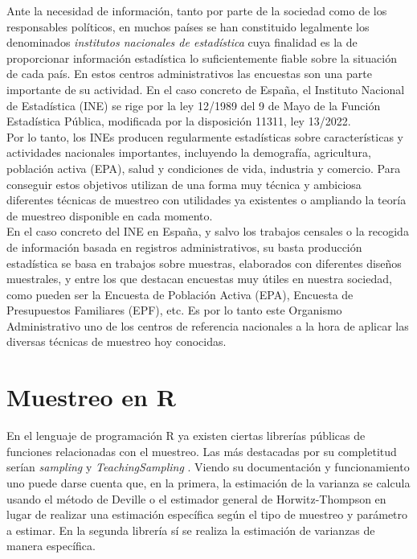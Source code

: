Ante la necesidad de información, tanto por parte de la sociedad como de los responsables políticos, en muchos países se han constituido legalmente los denominados \textit{institutos nacionales de estadística} cuya finalidad es la de proporcionar información estadística lo suficientemente fiable sobre la situación de cada país. En estos centros administrativos las encuestas son una parte importante de su actividad. En el caso concreto de España, el Instituto Nacional de Estadística (INE) se rige por la ley 12/1989 del 9 de Mayo de la Función Estadística Pública, modificada por la disposición 11311, ley 13/2022.\\

Por lo tanto, los INEs producen regularmente estadísticas sobre características y actividades nacionales importantes, incluyendo la demografía, agricultura, población activa (EPA), salud y condiciones de vida, industria y comercio. Para conseguir estos objetivos utilizan de una forma muy técnica y ambiciosa diferentes técnicas de muestreo con utilidades ya existentes o ampliando la teoría de muestreo disponible en cada momento. \\

En el caso concreto del INE en España, y salvo los trabajos censales o la recogida de información basada en registros administrativos, su basta producción estadística se basa en trabajos sobre muestras, elaborados con diferentes diseños muestrales, y entre los que destacan encuestas muy útiles en nuestra sociedad, como pueden ser la Encuesta de Población Activa (EPA),  Encuesta de Presupuestos Familiares (EPF), etc. Es por lo tanto este Organismo Administrativo uno de los centros de referencia nacionales a la hora de aplicar las diversas técnicas de muestreo hoy conocidas.

\section{Muestreo en R}
En el lenguaje de programación R ya existen ciertas librerías públicas de funciones relacionadas con el muestreo. Las más destacadas por su completitud serían \textit{sampling} \cite{sampling} y \textit{TeachingSampling} \cite{TeachingSampling}. Viendo su documentación y funcionamiento uno puede darse cuenta que, en la primera, la estimación de la varianza se calcula usando el método de Deville o el estimador general de Horwitz-Thompson en lugar de realizar una estimación específica según el tipo de muestreo y parámetro a estimar. En la segunda librería sí se realiza la estimación de varianzas de manera específica.\\

